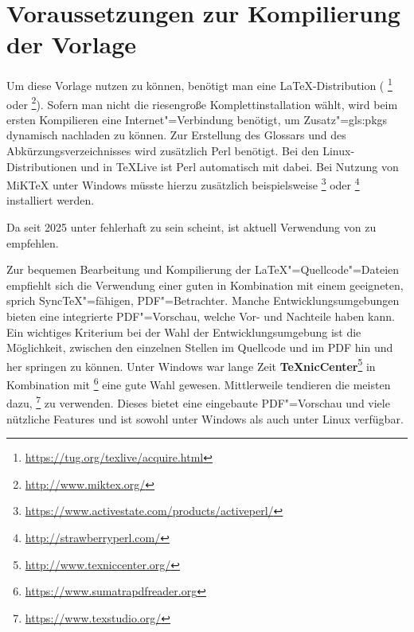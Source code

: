\section{Voraussetzungen zur Kompilierung der Vorlage}%
\label{sec:Voraussetzungen}
%
Um diese Vorlage nutzen zu können, benötigt man eine \LaTeX-Distribution (\zB{} \footnote{\url{https://tug.org/texlive/acquire.html}} oder \footnote{\url{http://www.miktex.org/}}).
Sofern man nicht die riesengroße Komplettinstallation wählt, wird beim ersten Kompilieren eine Internet"=Verbindung benötigt, um Zusatz"=\glspl{gls:pkg} dynamisch nachladen zu können.
Zur Erstellung des Glossars und des Abkürzungsverzeichnisses wird zusätzlich Perl benötigt.
Bei den Linux-Distributionen und in TeXLive ist Perl automatisch mit dabei.
Bei Nutzung von MiKTeX unter Windows müsste hierzu zusätzlich beispielsweise \footnote{\url{https://www.activestate.com/products/activeperl/}}
oder \footnote{\url{http://strawberryperl.com/}} installiert werden.

Da seit 2025  unter  fehlerhaft zu sein scheint, ist aktuell Verwendung von  zu empfehlen.

Zur bequemen Bearbeitung und Kompilierung der \LaTeX"=Quellcode"=Dateien empfiehlt sich die Verwendung einer guten  in Kombination mit einem geeigneten, sprich SyncTeX"=fähigen, PDF"=Betrachter.
Manche Entwicklungsumgebungen bieten eine integrierte PDF"=Vorschau, welche Vor- und Nachteile haben kann.
Ein wichtiges Kriterium bei der Wahl der Entwicklungsumgebung ist die Möglichkeit, zwischen den einzelnen Stellen im Quellcode und im PDF hin und her springen zu können.
Unter Windows war lange Zeit \textbf{TeXnicCenter}\footnote{\url{http://www.texniccenter.org/}} in Kombination mit \footnote{\url{https://www.sumatrapdfreader.org}} eine gute Wahl gewesen.
Mittlerweile tendieren die meisten dazu, \footnote{\url{https://www.texstudio.org/}} zu verwenden.
Dieses bietet eine eingebaute PDF"=Vorschau und viele nützliche Features und ist sowohl unter Windows als auch unter Linux verfügbar.

